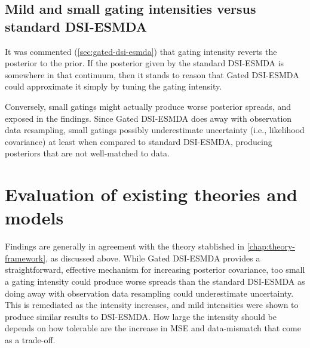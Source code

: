 \subsection{Mild and small gating intensities versus standard DSI-ESMDA}
It was commented (\cref{sec:gated-dsi-esmda}) 
that gating intensity reverts the posterior to the prior.
If the posterior given by the standard DSI-ESMDA is somewhere in that continuum,
then it stands to reason that Gated DSI-ESMDA could approximate it simply by tuning the gating intensity.

Conversely, small gatings might actually produce worse posterior spreads,
and exposed in the findings.
%
Since Gated DSI-ESMDA does away with observation data resampling,
small gatings possibly underestimate uncertainty (i.e., likelihood covariance)
at least when compared to standard DSI-ESMDA,
producing posteriors that are not well-matched to data. 

\section{Evaluation of existing theories and models}

Findings are generally in agreement with the theory stablished in 
\cref{chap:theory-framework}, as discussed above.
%
While Gated DSI-ESMDA provides a straightforward, effective mechanism for 
increasing posterior covariance, too small a gating intensity could produce worse spreads than the standard DSI-ESMDA
as doing away with observation data resampling could underestimate uncertainty.
%
This is remediated as the intensity increases, and mild intensities were shown to produce 
similar results to DSI-ESMDA.
%
How large the intensity should be depends on how tolerable are the 
increase in MSE and data-mismatch that come as a trade-off.
